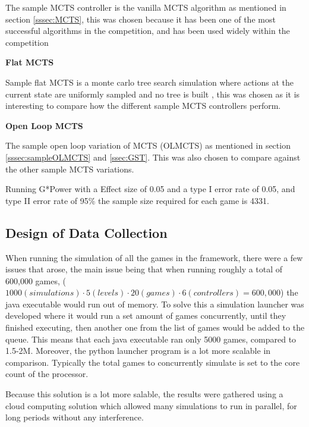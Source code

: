 \documentclass[journal]{IEEEtran}
\begin{document}
	The sample MCTS controller is the vanilla MCTS algorithm as mentioned in section \ref{sssec:MCTS}, this was chosen because it has been one of the most successful algorithms in the competition, and has been used widely within the competition \cite{perez20162014, perez2018general}

	\textbf{Flat MCTS}

	Sample flat MCTS is a monte carlo tree search simulation where actions at the current state are uniformly sampled and no tree is built \cite{browne2012survey}, this was chosen as it is interesting to compare how the different sample MCTS controllers perform.

	\textbf{Open Loop MCTS}

	The sample open loop variation of MCTS (OLMCTS) as mentioned in section \ref{sssec:sampleOLMCTS} and \ref{ssec:GST}. This was also chosen to compare against the other sample MCTS variations.





		Running G*Power with a Effect size of 0.05 and a type I error rate of 0.05, and type II error rate of 95\% the sample size required for each game is 4331.


	
	

	\subsection{Design of Data Collection}
	
	When running the simulation of all the games in the framework, there were a few issues that arose, the main issue being that when running roughly a total of 600,000 games, ($ 1000(simulations) \cdot 5 (levels) \cdot 20 (games) \cdot 6 (controllers) = 600,000$) the java executable would run out of memory.
	To solve this a simulation launcher was developed where it would run a set amount of games concurrently, until they finished executing, then another one from the list of games would be added to the queue. This means that each java executable ran only 5000 games, compared to 1.5-2M. Moreover, the python launcher program is a lot more scalable in comparison.
	Typically the total games to concurrently simulate is set to the core count of the processor.

	Because this solution is a lot more salable, the results were gathered using a cloud computing solution which allowed many simulations to run in parallel, for long periods without any interference.
	
\end{document}
